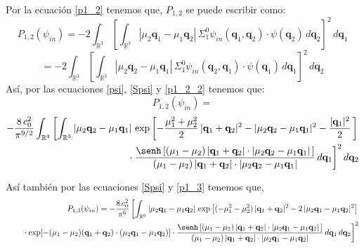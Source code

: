 \documentclass[12pt]{book}
\numberwithin{equation}{chapter}
\def\q{\mathbf{q}}
\def\R{\mathbb{R}}
\begin{document}
Por la ecuaci\'on \eqref{p1_2} tenemos que, $P_{1,2}$ se puede escribir como:
$$P_{1,2}(\psi_{in})= -2 \int_{\R^{3}} \left[ \int_{\R^{3}} |\mu_{2}\q_{1}-\mu_{1}\q_{2}|\, \Sigma_{1}^{0} \psi_{in}(\q_{1},\q_{2})\cdot \psi (\q_{2})\, d\q_{2} \right]^{2} \, d\q_{1} $$
\begin{equation}\label{p1_2_2}
=-2 \int_{\R^{3}} \left[ \int_{\R^{3}} |\mu_{2}\q_{2}-\mu_{1}\q_{1}|\, \Sigma_{1}^{0} \psi_{in}(\q_{2},\q_{1})\cdot \psi (\q_{1})\, d\q_{1} \right]^{2} \, d\q_{2}
\end{equation}
As\'i, por las ecuaciones \eqref{psi}, \eqref{Spsi} y \eqref{p1_2_2} tenemos que:
$$P_{1,2}(\psi_{in})= $$
\begin{align}\label{p12exp}
-\frac{8\,c_{0}^{2}}{\pi^{9/2}} \int_{\R^{3}} \left[ \int_{\R^{3}}
|\mu_{2}\q_{2}-\mu_{1}\q_{1}|\, \exp \left[ -\frac{\mu_{1}^{2}+\mu_{2}^{2}}{2}\, |\q_{1}+\q_{2}|^{2} - |\mu_{2}\q_{2}-\mu_{1}\q_{1}|^{2}-\frac{|\q_{1}|^{2}}{2}\, \right]
\right.
\nonumber\\
\qquad \left. \vphantom{\int_{\R^{2}}}
\cdot \frac{ \senh \left[ (\mu_{1}-\mu_{2})\, |\q_{1}+\q_{2}|\cdot |\mu_{2}\q_{2}-\mu_{1}\q_{1}| \, \right]}{ (\mu_{1}-\mu_{2})\, |\q_{1}+\q_{2}|\cdot |\mu_{2}\q_{2}-\mu_{1}\q_{1}| }
\,d\q_{1} \right]^{2} d\q_{2}
\end{align}

As\'i tambi\'en por las ecuaciones \eqref{Spsi} y \eqref{p1_3} tenemos que,
\begin{align}\label{p13exp}
P_{1,3}(\psi_{in})=
-\frac{8\,c_{0}^{2}}{\pi^{6}} \left[ \int_{\R^{6}}
|\mu_{2}\q_{1}-\mu_{1}\q_{2}|\, \exp \left[ (-\mu_{1}^{2}-\mu_{2}^{2})\, |\q_{1}+\q_{2}|^{2} - 2\,|\mu_{2}\q_{1}-\mu_{1}\q_{2}|^{2} \right]
\right.
\nonumber\\
\qquad \left. \vphantom{\int_{\R^{6}}}
\cdot \exp[ -(\mu_{1}-\mu_{2})(\q_{1}+\q_{2})\cdot(\mu_{2}\q_{1}-\mu_{1}\q_{2}) ]
\cdot \frac{ \senh \left[ (\mu_{1}-\mu_{2})\, |\q_{1}+\q_{2}|\cdot |\mu_{2}\q_{1}-\mu_{1}\q_{2}| \, \right]}{ (\mu_{1}-\mu_{2})\, |\q_{1}+\q_{2}|\cdot |\mu_{2}\q_{1}-\mu_{1}\q_{2}| }
\,d\q_{1}\, d\q_{2} \right]^{2}
\end{align}

\newpage
\end{document}
